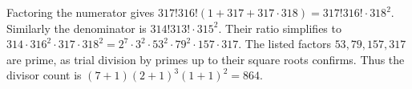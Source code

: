 Factoring the numerator gives $317!316!(1+317+317\cdot318)=317!316!\cdot318^2$. Similarly the denominator is $314!313!\cdot315^2$. Their ratio simplifies to $314\cdot316^2\cdot317\cdot318^2=2^7\cdot3^2\cdot53^2\cdot79^2\cdot157\cdot317$. The listed factors $53,79,157,317$ are prime, as trial division by primes up to their square roots confirms. Thus the divisor count is $(7+1)(2+1)^3(1+1)^2=\boxed{864}$.
